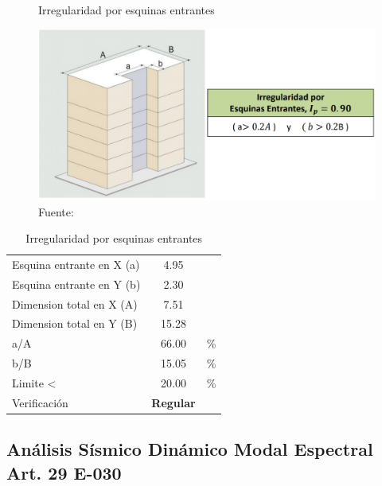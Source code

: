 \documentclass[12pt]{article}
\begin{document}
\begin{figure}[h!]
    \centering
    \caption{Irregularidad por esquinas entrantes}
    \includegraphics[scale=0.7]{IMAGENES/19.PNG}
    \caption*{\small Fuente: \it \cite{comen}}
    \label{fig:my_label}
\end{figure}

\begin{table}[h!]
  \centering
  \caption{Irregularidad por esquinas entrantes}
    \begin{tabular}{|ll|c|r}
\cline{1-3}    \multicolumn{2}{|l|}{Esquina entrante en X (a)} & 4.95  &  \\
\cline{1-3}    \multicolumn{2}{|l|}{Esquina entrante en Y (b)} & 2.30  &  \\
\cline{1-3}    \multicolumn{2}{|l|}{Dimension total en X (A)} & 7.51  &  \\
\cline{1-3}    \multicolumn{2}{|l|}{Dimension total en Y (B)} & 15.28 &  \\
\cline{1-3}    \multicolumn{2}{|l|}{a/A} & 66.00 & \multicolumn{1}{l}{\%} \\
\cline{1-3}    \multicolumn{2}{|l|}{b/B} & 15.05 & \multicolumn{1}{l}{\%} \\
\cline{1-3}    \multicolumn{2}{|l|}{Limite <} & 20.00 & \multicolumn{1}{l}{\%} \\
\cline{1-3}    \multicolumn{2}{|l|}{Verificación} & \textcolor[rgb]{ .267,  .447,  .769}{\textbf{Regular}} &  \\
\cline{1-3}    \end{tabular}%
  \label{tab:addlabel}%
\end{table}%


\subsection{Análisis Sísmico Dinámico Modal Espectral Art. 29 E-030}
\end{document}
